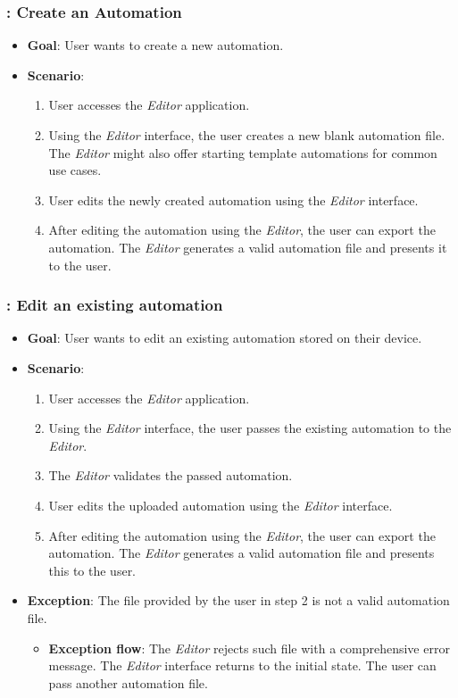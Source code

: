 \subsubsection*{\usecase: Create an Automation}
\begin{itemize}
    \item \textbf{Goal}: User wants to create a new automation.
    \item \textbf{Scenario}: 
    \begin{enumerate}[label=\arabic*.]
        \item User accesses the \textit{Editor} application. 
        \item Using the \textit{Editor} interface, the user creates a new blank automation file.
        The \textit{Editor} might also offer starting template automations for common use cases.
        \item User edits the newly created automation using the \textit{Editor} interface.
        \item After editing the automation using the \textit{Editor}, the user can export the automation. 
        The \textit{Editor} generates a valid automation file and presents it to the user.
    \end{enumerate}
\end{itemize}

\subsubsection*{\usecase: Edit an existing automation}
\begin{itemize}
    \item \textbf{Goal}: User wants to edit an existing automation stored on their device. 
    \item \textbf{Scenario}: 
    \begin{enumerate}[label=\arabic*.]
        \item User accesses the \textit{Editor} application. 
        \item Using the \textit{Editor} interface, the user passes the existing automation to the \textit{Editor}.
        \item The \textit{Editor} validates the passed automation.
        \item User edits the uploaded automation using the \textit{Editor} interface.
        \item After editing the automation using the \textit{Editor}, the user can export the automation. 
        The \textit{Editor} generates a valid automation file and presents this to the user.
    \end{enumerate}
    \item \textbf{Exception}: The file provided by the user in step 2 is not a valid automation file.
    \begin{itemize}
        \item \textbf{Exception flow}: The \textit{Editor} rejects such file with a comprehensive error message. 
        The \textit{Editor} interface returns to the initial state. The user can pass another automation file.
    \end{itemize}
\end{itemize}

